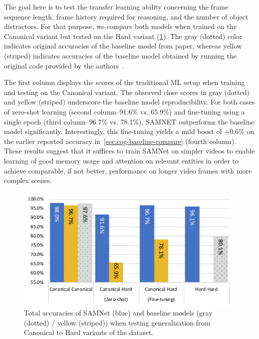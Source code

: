 The goal here is to test the transfer learning ability concerning the frame sequence length, frame history required for reasoning, and the number of object distractors.
For that purpose, we compare both models when trained on the Canonical variant but tested on the Hard variant (\cref{fig:samnet_cog_overall_transfer}).
The gray (dotted) color indicates original accuracies of the baseline model from paper,
whereas yellow (striped) indicates accuracies of the baseline model obtained by running the original code provided by the authors~\cite{yang2018implement}.

The first column displays the scores of the traditional ML setup when training and testing on the Canonical variant.
The observed close scores in gray (dotted) and yellow (striped) underscore the baseline model reproducibility.
For both cases of zero-shot learning (second column--91.6\% vs. 65.9\%) and fine-tuning using a single epoch (third column--96.7\% vs. 78.1\%), SAMNET outperforms the baseline model significantly.
Interestingly, this fine-tuning yields a mild boost of +0.6\% on the earlier reported accuracy in~\cref{sec:cog-baseline-compare} (fourth column).
These results suggest that it suffices to train SAMNet on simpler videos to enable learning of good memory usage and attention on relevant entities in order to achieve comparable, if not better, performance on longer video frames with more complex scenes.

\begin{figure}[htbp]
	\centering
	\includegraphics[width=\columnwidth]{../results/samnet_cog_overall_transfer_new.pdf}
	\caption{Total accuracies of SAMNet (blue) and baseline models (gray (dotted) / yellow (striped)) when testing generalization from Canonical to Hard variants of the dataset.}
	\label{fig:samnet_cog_overall_transfer}
\end{figure}


